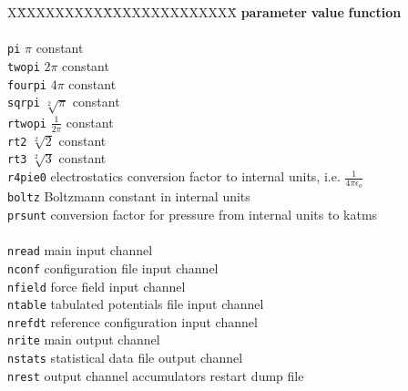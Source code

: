 \begin{tabbing}
X\=XXXXXXXXX\=XXXXXXXXXXXXXX\=\kill
\> {\bf parameter}   \> {\bf value}          \> {\bf function} \\
\>                   \>                      \> \\
\> {\tt pi}            \> $\pi$ constant \\
\> {\tt twopi}         \> $2 \pi$ constant \\
\> {\tt fourpi}       \> $4 \pi$ constant \\
\> {\tt sqrpi}           \> $\sqrt[2]{\pi}$ constant \\
\> {\tt rtwopi}        \> $\frac{1}{2 \pi}$ constant \\
\> {\tt rt2}           \> $\sqrt[2]{2}$ constant \\
\> {\tt rt3}           \> $\sqrt[2]{3}$ constant \\
\> {\tt r4pie0}                \> electrostatics conversion factor to internal units, i.e. $\frac{1}{4 \pi \epsilon_{o}}$ \\
\> {\tt boltz}                 \> Boltzmann constant in internal units \\
\> {\tt prsunt}                \> conversion factor for pressure from internal units to katms \\
\>                   \>                      \> \\
\> {\tt nread}                           \> main input channel \\
\> {\tt nconf}                          \> configuration file input channel \\
\> {\tt nfield}                         \> force field input channel \\
\> {\tt ntable}                         \> tabulated potentials file input channel \\
\> {\tt nrefdt}                         \> reference configuration input channel \\
\> {\tt nrite}                           \> main output channel \\
\> {\tt nstats}                         \> statistical data file output channel \\
\> {\tt nrest}                          \> output channel accumulators restart dump file \\

\end{tabbing}
